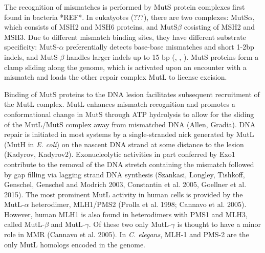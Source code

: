 The recognition of mismatches is performed by MutS protein complexes first found in bacteria *REF*.
In eukatyotes (???), there are two complexes: MutS$\alpha$, which consists of MSH2 and MSH6 proteins, 
and MutS$\beta$ cosisting of MSH2 and MSH3. Due to different mismatch binding sites, they have 
different substrate specificity: MutS-$\alpha$ preferentially detects base-base mismatches and short 1-2bp indels,
and MutS-$\beta$ handles larger indels up to 15 bp (\cite{Drummond1995-gc}, \cite{Habraken1996-vc}, 
\cite{Genschel1998-by}). MutS proteins form a clamp sliding along the genome, which is activated upon an
encounter with a mismatch and loads the other repair complex MutL to license excision.


Binding of MutS proteins to the DNA lesion facilitates subsequent recruitment of 
the MutL complex. MutL enhances mismatch recognition and 
promotes a conformational change in MutS through ATP hydrolysis to allow for the sliding of the MutL/MutS 
complex away from mismatched DNA (Allen, Gradia). DNA repair is initiated in most systems by a single-stranded 
nick generated by MutL (MutH in \textit{E. coli}) on the nascent DNA strand at some distance to the lesion 
(Kadyrov, Kadyrov2). Exonucleolytic activities in part conferred by Exo1 contribute to the removal of the DNA 
stretch containing the mismatch followed by gap filling via lagging strand DNA synthesis (Szankasi, Longley, 
Tishkoff, Genschel, Genschel and Modrich 2003, Constantin et al. 2005, Goellner et al. 2015). The most 
prominent MutL activity in human cells is provided by the MutL-$\alpha$ heterodimer, MLH1/PMS2 (Prolla et al. 1998; 
Cannavo et al. 2005). However, human MLH1 is also found in heterodimers with PMS1 and MLH3, called 
MutL-$\beta$ and MutL-$\gamma$. Of these two only MutL-$\gamma$ is thought to have a minor role in MMR 
(Cannavo et al. 2005). In \textit{C. elegans}, MLH-1 and PMS-2 are the only MutL homologs encoded in the genome.


